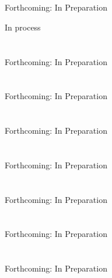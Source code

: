 \documentclass{report}
\begin{document}
\chapter{}
Forthcoming: In Preparation

In process




% 
\chapter{}
Forthcoming: In Preparation

% 
\chapter{}
Forthcoming: In Preparation

% 
\chapter{}
Forthcoming: In Preparation

% 
\chapter{}
Forthcoming: In Preparation

% 
\chapter{}
Forthcoming: In Preparation

% 
\chapter{}
Forthcoming: In Preparation

% 
\chapter{}
Forthcoming: In Preparation

% 
\end{document}
